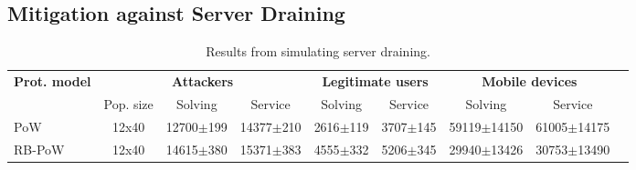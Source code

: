 \subsection{Mitigation against Server Draining}

  \begin{table}[H]
    \centering
    \tiny
    \caption{Results from simulating server draining.}\label{tab:draining}

    \begin{tabularx}{1.05\textwidth}{lcccccccr} \toprule
      \multicolumn{1}{c}{\textbf{Prot. model}} & \multicolumn{3}{c}{\textbf{Attackers}} & \multicolumn{2}{c}{\textbf{Legitimate users}} & \multicolumn{2}{c}{\textbf{Mobile devices}} \\
      \multicolumn{1}{c}{} & \multicolumn{1}{c}{Pop. size} & \multicolumn{1}{c}{Solving} & \multicolumn{1}{c}{Service} & \multicolumn{1}{c}{Solving} & \multicolumn{1}{c}{Service} & \multicolumn{1}{c}{Solving} & \multicolumn{1}{c}{Service}  \\ \toprule
      PoW &  12x40  & 12700$\pm$199 & 14377$\pm$210 & 2616$\pm$119 & 3707$\pm$145 & 59119$\pm$14150 & 61005$\pm$14175    \\
      RB-PoW & 12x40 & 14615$\pm$380 & 15371$\pm$383 & 4555$\pm$332 & 5206$\pm$345 & 29940$\pm$13426 & 30753$\pm$13490   \\ \bottomrule
    \end{tabularx}
  \end{table}
